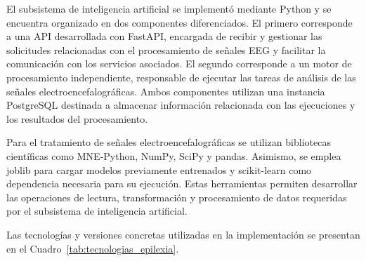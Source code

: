 El subsistema de inteligencia artificial se implementó mediante
Python y se encuentra organizado en dos componentes diferenciados.
El primero corresponde a una API desarrollada con FastAPI, encargada de recibir y gestionar las solicitudes relacionadas con el procesamiento de señales EEG y facilitar la comunicación con los servicios asociados. El segundo corresponde a un motor de procesamiento independiente, responsable de ejecutar las tareas de análisis de las señales electroencefalográficas. Ambos componentes utilizan una instancia PostgreSQL destinada a almacenar información relacionada con las ejecuciones y los resultados del procesamiento.

Para el tratamiento de señales electroencefalográficas se utilizan
bibliotecas científicas como MNE-Python, NumPy, SciPy y pandas.
Asimismo, se emplea joblib para cargar modelos previamente
entrenados y scikit-learn como dependencia necesaria para su
ejecución. Estas herramientas permiten desarrollar las operaciones
de lectura, transformación y procesamiento de datos requeridas
por el subsistema de inteligencia artificial.

Las tecnologías y versiones concretas utilizadas
en la implementación se presentan en el
Cuadro~\ref{tab:tecnologias_epilexia}.

\begingroup
\small
\setlength{\tabcolsep}{3pt}
\renewcommand{\arraystretch}{1.08}
\setlength{\LTleft}{0pt}
\setlength{\LTright}{0pt}

